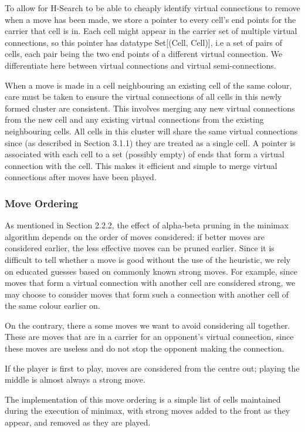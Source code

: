 To allow for H-Search to be able to cheaply identify virtual connections to remove when a move has been made, we store a pointer to every cell's end points for the carrier that cell is in. Each cell might appear in the carrier set of multiple virtual connections, so this pointer has datatype Set[(Cell, Cell)], i.e a set of pairs of cells, each pair being the two end points of a different virtual connection. We differentiate here between virtual connections and virtual semi-connections. 

When a move is made in a cell neighbouring an existing cell of the same colour, care must be taken to ensure the virtual connections of all cells in this newly formed cluster are consistent. This involves merging any new virtual connections from the new cell and any existing virtual connections from the existing neighbouring cells. All cells in this cluster will share the same virtual connections since (as described in Section 3.1.1) they are treated as a single cell. A pointer is associated with each cell to a set (possibly empty) of ends that form a virtual connection with the cell. This makes it efficient and simple to merge virtual connections after moves have been played. 

\subsubsection{Move Ordering}

As mentioned in Section 2.2.2, the effect of alpha-beta pruning in the minimax algorithm depends on the order of moves considered: if better moves are considered earlier, the less effective moves can be pruned earlier. Since it is difficult to tell whether a move is good without the use of the heuristic, we rely on educated guesses based on commonly known strong moves. For example, since moves that form a virtual connection with another cell are considered strong, we may choose to consider moves that form such a connection with another cell of the same colour earlier on. 


On the contrary, there a some moves we want to avoid considering all together. These are moves that are in a carrier for an opponent's virtual connection, since these moves are useless and do not stop the opponent making the connection.

If the player is first to play, moves are considered from the centre out; playing the middle is almost always a strong move.

The implementation of this move ordering is a simple list of cells maintained during the execution of minimax, with strong moves added to the front as they appear, and removed as they are played.

